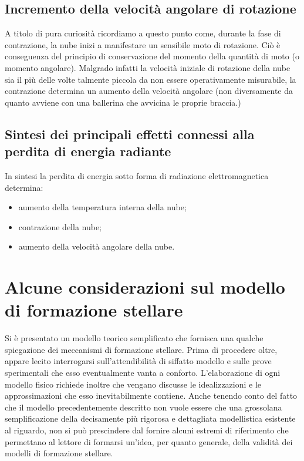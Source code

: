 \subsection{Incremento della velocit\`{a} angolare di rotazione}\label{rotazione}
A titolo di pura curiosit\`{a} ricordiamo a questo punto come, durante la fase
di contrazione, la nube inizi a manifestare un sensibile moto di rotazione.
Ci\`{o}  \`{e} conseguenza del principio di conservazione del momento della quantit\`{a} di moto (o momento angolare).
Malgrado infatti la velocit\`{a} iniziale di rotazione della nube sia il pi\`{u} delle volte talmente piccola da non essere operativamente misurabile, la contrazione determina un aumento della velocit\`{a} angolare (non diversamente da quanto avviene con una ballerina che avvicina le proprie braccia.)
\subsection{Sintesi dei principali effetti connessi alla perdita di energia radiante}\label{effetti perdita energia}
In sintesi la perdita di energia sotto forma di radiazione elettromagnetica determina:
\begin{itemize}
\item
aumento della temperatura interna della nube;
\item
contrazione della nube;
\item
aumento della velocit\`{a} angolare della nube.
\end{itemize}
\section{Alcune considerazioni sul modello di formazione stellare}\label{consideraz}
Si \`{e} presentato un modello teorico semplificato che fornisca una qualche spiegazione dei meccanismi di formazione stellare. Prima di procedere oltre, appare lecito interrogarsi sull'attendibilit\`{a} di siffatto modello e sulle prove sperimentali che esso eventualmente vanta a conforto. L'elaborazione di ogni modello fisico richiede inoltre che vengano discusse le idealizzazioni e le approssimazioni che esso inevitabilmente contiene.
Anche tenendo conto del fatto che il modello precedentemente descritto non vuole
essere che una grossolana semplificazione della decisamente  pi\`{u} rigorosa e
dettagliata modellistica esistente al riguardo, non si pu\`{o} prescindere dal fornire alcuni estremi di riferimento che permettano al lettore di formarsi un'idea, per quanto generale, della validit\`{a} dei modelli di formazione stellare.
\par


